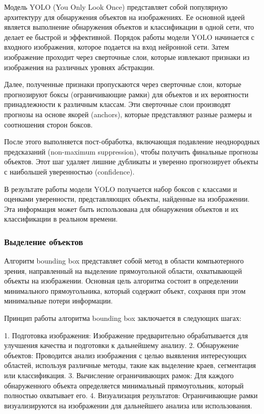Модель YOLO (You Only Look Once) представляет собой популярную архитектуру для обнаружения объектов на изображениях. Ее основной идеей является выполнение обнаружения объектов и классификации в одной сети, что делает ее быстрой и эффективной.
\cite{kirillov2023segment}
Порядок работы модели YOLO начинается с входного изображения, которое подается на вход нейронной сети. Затем изображение проходит через сверточные слои, которые извлекают признаки из изображения на различных уровнях абстракции.

Далее, полученные признаки пропускаются через сверточные слои, которые прогнозируют боксы (ограничивающие рамки) для объектов и их вероятности принадлежности к различным классам. Эти сверточные слои производят прогнозы на основе якорей (anchors), которые представляют разные размеры и соотношения сторон боксов.

После этого выполняется пост-обработка, включающая подавление неоднородных предсказаний (non-maximum suppression), чтобы получить финальные прогнозы объектов. Этот шаг удаляет лишние дубликаты и уверенно прогнозирует объекты с наибольшей уверенностью (confidence).

В результате работы модели YOLO получается набор боксов с классами и оценками уверенности, представляющих объекты, найденные на изображении. Эта информация может быть использована для обнаружения объектов и их классификации в реальном времени.

\subsubsection{Выделение объектов}


Алгоритм bounding box представляет собой метод в области компьютерного зрения, направленный на выделение прямоугольной области, охватывающей объекты на изображении. Основная цель алгоритма состоит в определении минимального прямоугольника, который содержит объект, сохраняя при этом минимальные потери информации.

Принцип работы алгоритма bounding box заключается в следующих шагах:

1. Подготовка изображения: Изображение предварительно обрабатывается для улучшения качества и подготовки к дальнейшему анализу.
2. Обнаружение объектов: Проводится анализ изображения с целью выявления интересующих областей, используя различные методы, такие как выделение краев, сегментация или классификация.
3. Вычисление ограничивающих рамок: Для каждого обнаруженного объекта определяется минимальный прямоугольник, который полностью охватывает его.
4. Визуализация результатов: Ограничивающие рамки визуализируются на изображении для дальнейшего анализа или использования.

